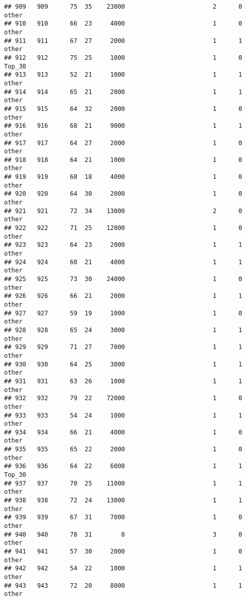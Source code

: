 \documentclass[
]{article}
\begin{document}
\begin{verbatim}
## 909   909      75  35    23000                        2      0    other
## 910   910      66  23     4000                        1      0    other
## 911   911      67  27     2000                        1      1    other
## 912   912      75  25     1000                        1      0   Top_30
## 913   913      52  21     1000                        1      1    other
## 914   914      65  21     2000                        1      1    other
## 915   915      64  32     2000                        1      0    other
## 916   916      68  21     9000                        1      1    other
## 917   917      64  27     2000                        1      0    other
## 918   918      64  21     1000                        1      0    other
## 919   919      68  18     4000                        1      0    other
## 920   920      64  30     2000                        1      0    other
## 921   921      72  34    13000                        2      0    other
## 922   922      71  25    12000                        1      0    other
## 923   923      64  23     2000                        1      1    other
## 924   924      60  21     4000                        1      1    other
## 925   925      73  30    24000                        1      0    other
## 926   926      66  21     2000                        1      1    other
## 927   927      59  19     1000                        1      0    other
## 928   928      65  24     3000                        1      1    other
## 929   929      71  27     7000                        1      1    other
## 930   930      64  25     3000                        1      1    other
## 931   931      63  26     1000                        1      1    other
## 932   932      79  22    72000                        1      0    other
## 933   933      54  24     1000                        1      1    other
## 934   934      66  21     4000                        1      0    other
## 935   935      65  22     2000                        1      0    other
## 936   936      64  22     6000                        1      1   Top_30
## 937   937      70  25    11000                        1      1    other
## 938   938      72  24    13000                        1      1    other
## 939   939      67  31     7000                        1      0    other
## 940   940      78  31        0                        3      0    other
## 941   941      57  30     2000                        1      0    other
## 942   942      54  22     1000                        1      1    other
## 943   943      72  20     8000                        1      1    other

\end{verbatim}
\end{document}

